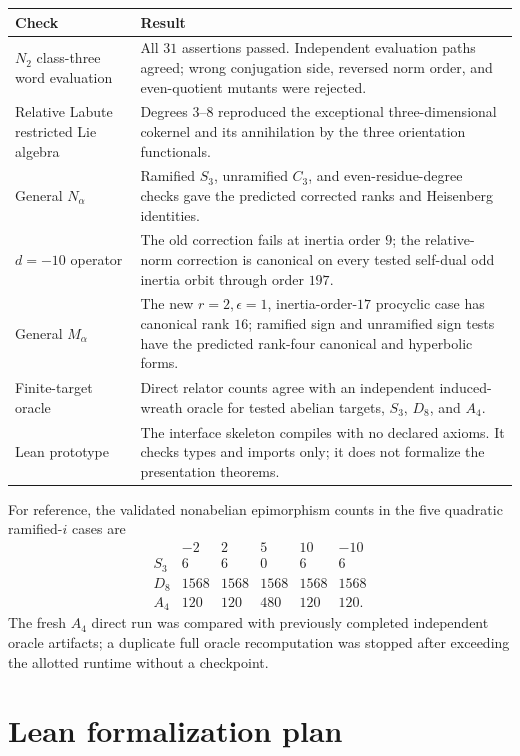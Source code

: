 \documentclass[11pt,reqno]{amsart}
\theoremstyle{definition}
\theoremstyle{remark}
\numberwithin{equation}{section}
\begin{document}
\begin{longtable}{p{}p{}}
\toprule
Check & Result\\
\midrule
\endhead
\(N_2\) class-three word evaluation&
All \(31\) assertions passed.  Independent evaluation paths agreed;
wrong conjugation side, reversed norm order, and even-quotient mutants
were rejected.\\
\addlinespace
Relative Labute restricted Lie algebra&
Degrees \(3\)--\(8\) reproduced the exceptional three-dimensional
cokernel and its annihilation by the three orientation functionals.\\
\addlinespace
General \(N_\alpha\)&
Ramified \(S_3\), unramified \(C_3\), and even-residue-degree checks
gave the predicted corrected ranks and Heisenberg identities.\\
\addlinespace
\(d=-10\) operator&
The old correction fails at inertia order \(9\); the relative-norm
correction is canonical on every tested self-dual odd inertia orbit
through order \(197\).\\
\addlinespace
General \(M_\alpha\)&
The new \(r=2,\epsilon=1\), inertia-order-\(17\) procyclic case has
canonical rank \(16\); ramified sign and unramified sign tests have the
predicted rank-four canonical and hyperbolic forms.\\
\addlinespace
Finite-target oracle&
Direct relator counts agree with an independent induced-wreath oracle
for tested abelian targets, \(S_3\), \(D_8\), and \(A_4\).\\
\addlinespace
Lean prototype&
The interface skeleton compiles with no declared axioms.  It checks
types and imports only; it does not formalize the presentation
theorems.\\
\bottomrule
\end{longtable}

For reference, the validated nonabelian epimorphism counts in the five
quadratic ramified-\(i\) cases are
\[
\begin{array}{c|rrrrr}
 &-2&2&5&10&-10\\ \hline
 S_3&6&6&0&6&6\\
 D_8&1568&1568&1568&1568&1568\\
 A_4&120&120&480&120&120.
\end{array}
\]
The fresh \(A_4\) direct run was compared with previously completed
independent oracle artifacts; a duplicate full oracle recomputation was
stopped after exceeding the allotted runtime without a checkpoint.

\section{Lean formalization plan}\label{sec:lean}
\end{document}
